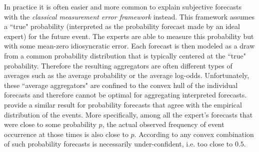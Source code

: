 \documentclass[11pt]{article}
\theoremstyle{definition}
\theoremstyle{definition}
\begin{document}
In practice it is often easier and more common to explain subjective forecasts with the \textit{classical measurement error framework} instead. This framework assumes a ``true" probability (interpreted as the probability forecast made by an ideal expert) for the future event. The experts are able to measure this probability but with some mean-zero idiosyncratic error. Each forecast is then modeled as a draw from a common probability distribution that is typically centered at the ``true" probability. Therefore the resulting aggregators are often different types of averages such as the average probability or the average log-odds. 
Unfortunately, these ``average aggregators" are confined to the convex hull of the individual forecasts and therefore cannot be optimal for aggregating interpreted forecasts. \cite{Ranjan08} provide a similar result for probability forecasts that agree with the empirical distribution of the events. More specifically, among all the expert's forecasts that were close to some probability $p$, the actual observed frequency of event occurrence at those times is also close to $p$. According to \cite{Ranjan08} any convex combination of such probability forecasts is necessarily under-confident, i.e. too close to $0.5$. 
  
\end{document}
